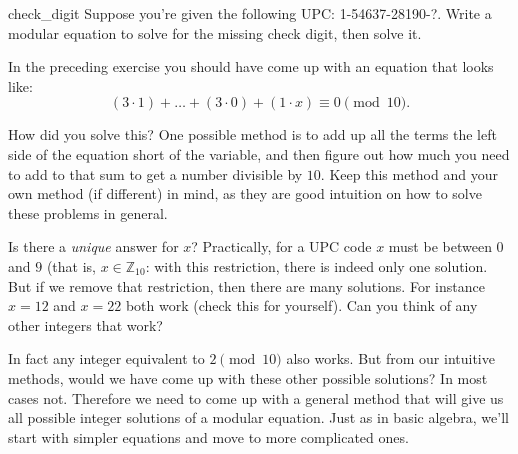 \begin{exercise}{check_digit}
Suppose you're given the following UPC:  1-54637-28190-?.  Write a modular equation to solve for the missing check digit, then solve it.
\end{exercise}{}

In the preceding exercise you should have come up with an equation that looks like:
\[
(3 \cdot 1) +  \ldots + (3 \cdot 0) + (1 \cdot x) \equiv 0 \pmod{10}.
\]

How did you solve this?  One possible method is to add up all the terms the left side of the equation short of the variable, and then figure out how much you need to add to that sum to get a number divisible by $10$. Keep this method and your own method (if different) in mind, as they are good intuition on how to solve these problems in general.

Is there a \emph{unique} answer for $x$?  Practically, for a UPC code $x$ must be between $0$ and $9$ (that is, $x \in {\mathbb Z}_{10}$: with this restriction, there is indeed only one solution.  But if we remove that restriction, then there are many solutions.  For instance $x=12$ and $x =22$ both work (check this for yourself).  Can you think of any other integers that work? 


In fact any integer equivalent to $2 \pmod{10}$ also works.  But from our intuitive methods, would we have come up with these other possible solutions?  In most cases not.  Therefore we need to come up with a general method that will give us all possible integer solutions of a modular equation.  Just as in basic algebra, we'll start with simpler equations and move to more complicated ones. 

